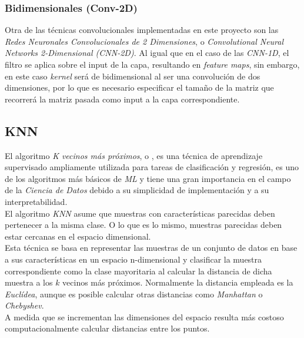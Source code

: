                 
            \subsubsection {Bidimensionales (Conv-2D)}
                Otra de las técnicas convolucionales implementadas en este proyecto son las \textit{Redes Neuronales Convolucionales de 2 Dimensiones}, o \textit{Convolutional Neural Networks 2-Dimensional (CNN-2D)}. Al igual que en el caso de las \textit{CNN-1D}, el filtro se aplica sobre el input de la capa, resultando en \textit{feature maps}, sin embargo, en este caso \textit{kernel} será de bidimensional al ser una convolución de dos dimensiones, por lo que es necesario especificar el tamaño de la matriz que recorrerá la matriz pasada como input a la capa correspondiente.

                \textit{}

        \subsection {KNN}

            El algoritmo \textit{K vecinos más próximos}, o  \cite{KNN}, es una técnica de aprendizaje supervisado ampliamente utilizada para tareas de clasificación y regresión, es uno de los algoritmos más básicos de \textit{ML} y tiene una gran importancia en el campo de la \textit{Ciencia de Datos} debido a su simplicidad de implementación y a su interpretabilidad.\\

            El algoritmo \textit{KNN} asume que muestras con características parecidas deben pertenecer a la misma clase. O lo que es lo mismo, muestras parecidas deben estar cercanas en el espacio dimensional.\\

            Esta técnica se basa en representar las muestras de un conjunto de datos en base a sus características en un espacio n-dimensional y clasificar la muestra correspondiente como la clase mayoritaria al calcular la distancia de dicha muestra a los $k$ vecinos más próximos. Normalmente la distancia empleada es la \textit{Euclídea}, aunque es posible calcular otras distancias como \textit{Manhattan} o \textit{Chebyshev}.\\
            
            A medida que se incrementan las dimensiones del espacio resulta más costoso computacionalmente calcular distancias entre los puntos.\\


